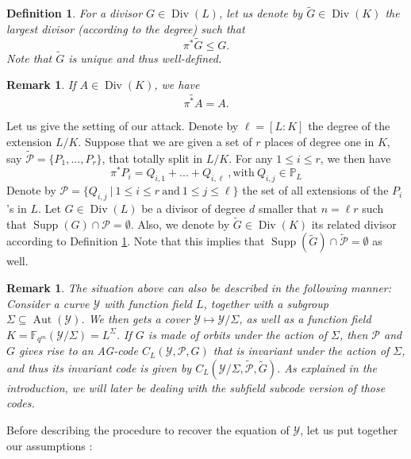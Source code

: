 \documentclass[10pt]{article}
\newtheorem{def1}[thm]{Definition}
\newtheorem{rq1}[thm]{Remark}
\newcommand{\s}{\vspace{0.3cm}}
\newcommand{\PP}{\mathbb{P}}
\newcommand{\fqm}{\mathbb{F}_{q^m}}
\newcommand{\su}{\subseteq}
\newcommand{\Y}{\mathcal{Y}}
\newcommand{\PR}{\mathcal{P}}
\newcommand{\Div}{\operatorname{Div}}
\newcommand{\Supp}{\operatorname{Supp}}
\newcommand{\Aut}{\operatorname{Aut}}
\newcommand{\hugues}[1]{\textcolor{blue}{#1}}
\newcommand{\notehugues}[1]{\marginpar{\small\hugues{#1}}}
\begin{document}
\s

\begin{def1} \label{pousséavant}
For a divisor $G \in \Div(L)$, let us denote by $\tilde{G} \in \Div(K)$ the largest divisor (according to the degree) such that
\[\pi^*\tilde{G} \leq G.\]
Note that $\tilde{G}$ is unique and thus well-defined.\notehugues{compatibilité avec Prop.~\ref{invrr}~?}
\end{def1} 

\s 

\begin{rq1} \label{jsp}
If $A \in \Div(K)$, we have 
\[\widetilde{\pi^*A}=A.\]
\end{rq1}

\s

Let us give the setting of our attack. Denote by $\ell=[L:K]$ the degree of the extension $L/K$. Suppose that we are given a set of $r$ places of degree one in $K$, say $\tilde{\PR} = \{P_1,...,P_r\}$, that totally split in $L/K$. For any $1 \leq i \leq r$, we then have
\notehugues{notation déroutante d'avoir les $Q$ dans $K$ et les $P$ dans $L$} 
\[\pi^*P_i = Q_{i,1} + ... + Q_{i,\ell} \ , \textrm{with}  \ Q_{i,j} \in \PP_L\]
Denote by $\PR = \{Q_{i,j} \ | \ 1 \leq i \leq r \ \mathrm{and} \ 1 \leq j \leq \ell\}$ the set of all extensions of the $P_i$'s in $L$. Let $G \in \Div(L)$ be a divisor of degree $d$ smaller that $n=\ell r$ such that $\Supp(G) \cap \PR = \emptyset$. Also, we denote by $\tilde{G} \in \Div(K)$ its related divisor according to Definition \ref{pousséavant}.
Note that this implies that $\Supp(\tilde{G}) \cap \tilde{\PR} = \emptyset$ as well. 

\s

\begin{rq1} \rm
The situation above can also be described in the following manner:
\notehugues{cas galoisien uniquement~?}
Consider a curve $\Y$ with function field $L$, together with a subgroup $\Sigma \su \Aut(\Y)$. We then gets a cover $\Y \longmapsto \Y/\Sigma$, as well as a function field $K = \fqm(\Y/\Sigma) = L^{\Sigma}$. If $G$ is made of orbits under the action of $\Sigma$, then $\PR$ and $G$ gives rise to an AG-code $C_L(\Y,\PR,G)$ that is invariant under the action of $\Sigma$, and thus its invariant code is given by $C_L(\Y/\Sigma,\tilde{\PR},\tilde{G})$. As explained in the introduction, we will later be dealing with the subfield subcode version of those codes.  
\end{rq1}

\s

Before describing the procedure to recover the equation of $\Y$, let us put together our assumptions :
\end{document}
